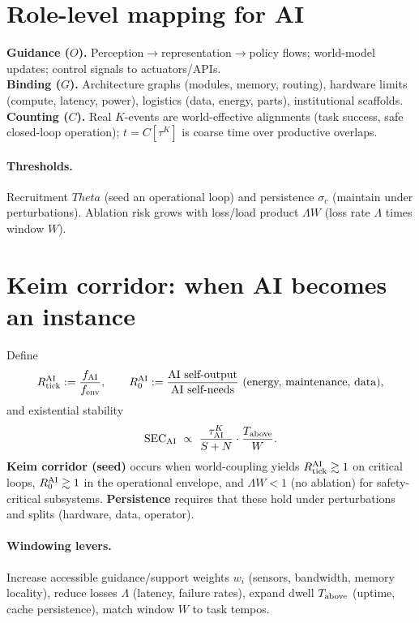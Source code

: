 \documentclass[12pt,a4paper,oneside]{scrreprt}
\def\Theta{Theta}%
\begin{document}
\section{Role-level mapping for AI}\label{sec:ai-mapping}
\textbf{Guidance ($O$).} Perception$\to$representation$\to$policy flows; world-model updates; control signals to actuators/APIs.\\
\textbf{Binding ($G$).} Architecture graphs (modules, memory, routing), hardware limits (compute, latency, power), logistics (data, energy, parts), institutional scaffolds.\\
\textbf{Counting ($C$).} Real $K$-events are world-effective alignments (task success, safe closed-loop operation); $t=C[\tau^K]$ is coarse time over productive overlaps.

\paragraph{Thresholds.}
Recruitment $\Theta$ (seed an operational loop) and persistence $\sigma_c$ (maintain under perturbations). 
Ablation risk grows with loss/load product $\Lambda W$ (loss rate $\Lambda$ times window $W$).

\section{Keim corridor: when AI becomes an instance}\label{sec:ai-keim-corridor}
Define
\[
R_{\rm tick}^{\rm AI}:=\frac{f_{\rm AI}}{f_{\rm env}},\qquad 
R_0^{\rm AI}:=\frac{\text{AI self-output}}{\text{AI self-needs}}\ (\text{energy, maintenance, data}),
\]
and existential stability
\[
\mathrm{SEC}_{\rm AI}\ \propto\ \frac{\tau^K_{\rm AI}}{S+N}\cdot\frac{T_{\rm above}}{W}.
\]
\textbf{Keim corridor (seed)} occurs when world-coupling yields $R_{\rm tick}^{\rm AI}\gtrsim 1$ on critical loops, $R_0^{\rm AI}\gtrsim 1$ in the operational envelope, and $\Lambda W<1$ (no ablation) for safety-critical subsystems. 
\textbf{Persistence} requires that these hold under perturbations and splits (hardware, data, operator).

\paragraph{Windowing levers.}
Increase accessible guidance/support weights $w_i$ (sensors, bandwidth, memory locality), reduce losses $\Lambda$ (latency, failure rates), expand dwell $T_{\rm above}$ (uptime, cache persistence), match window $W$ to task tempos.
\end{document}
